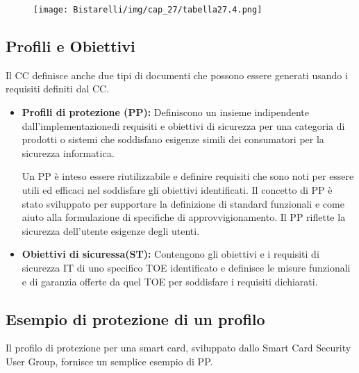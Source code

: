 \begin{figure}[H]
	\centering
    \texttt{[image: Bistarelli/img/cap\_27/tabella27.4.png]}
\end{figure}
\newpage
\subsection{Profili e Obiettivi}
Il CC definisce anche due tipi di documenti che possono essere generati usando i requisiti definiti dal CC.

\begin{itemize}
    \item \textbf{Profili di protezione (PP):} Definiscono un insieme indipendente dall'implementazionedi requisiti e obiettivi di sicurezza per una categoria di prodotti o sistemi che soddisfano esigenze simili dei consumatori per la sicurezza informatica.
    
    Un PP è inteso essere riutilizzabile e definire requisiti che sono noti per essere utili ed efficaci nel soddisfare gli obiettivi identificati. Il concetto di PP è stato sviluppato per supportare la definizione di standard funzionali e come aiuto alla formulazione di specifiche di approvvigionamento. Il PP riflette la sicurezza dell'utente esigenze degli utenti.
    
    \item \textbf{Obiettivi di sicuressa(ST):} Contengono gli obiettivi e i requisiti di sicurezza IT di uno specifico TOE identificato e definisce le misure funzionali e di garanzia offerte da quel TOE per soddisfare i requisiti dichiarati. 
\end{itemize}
\newpage
\subsection{Esempio di protezione di un profilo}
Il profilo di protezione per una smart card, sviluppato dallo Smart Card Security User Group, fornisce un semplice esempio di PP.

\singlespacing

